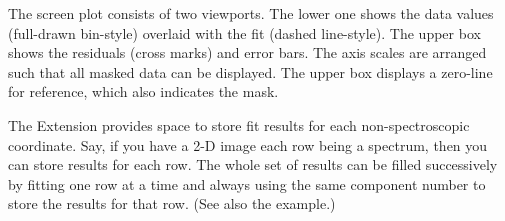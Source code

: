 {{      The screen plot consists of two viewports. The lower one shows the
      data values (full-drawn bin-style) overlaid with the fit (dashed
      line-style). The upper box shows the residuals (cross marks)
      and error bars. The axis scales are arranged such that
      all masked data can be displayed. The upper box displays a
      zero-line for reference, which also indicates the mask.

      The Extension provides space to store fit results for each
      non-spectroscopic coordinate. Say, if you have a 2-D image each
      row being a spectrum, then you can store results for each row. The
      whole set of results can be filled successively by fitting one row
      at a time and always using the same component number to store the
      results for that row. (See also the example.)

}}
